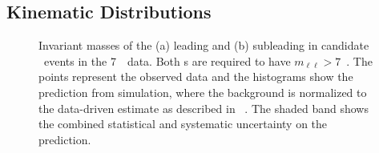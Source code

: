 \subsection{Kinematic Distributions}

\begin{figure}[htbp]
    \begin{center}
    \label{fig:zzdists-Zmass-seven}
    \caption[Invariant masses of the (a) leading and (b) subleading \leppair
    in candidate \ZZ\ events in the 7~\tev\ data.]
    {Invariant masses of the (a) leading and (b) subleading \leppair
    in candidate \ZZ\ events in the 7~\tev\ data. Both \leppair s are required to have
    $m_{\ell\ell}>7$~\gev.  The points represent the observed data and the
    histograms show the prediction from simulation, where the background is
    normalized to the data-driven estimate as described in
    ~. The shaded band shows the combined statistical and
    systematic uncertainty on the prediction. 
}
\end{center}
\end{figure}

